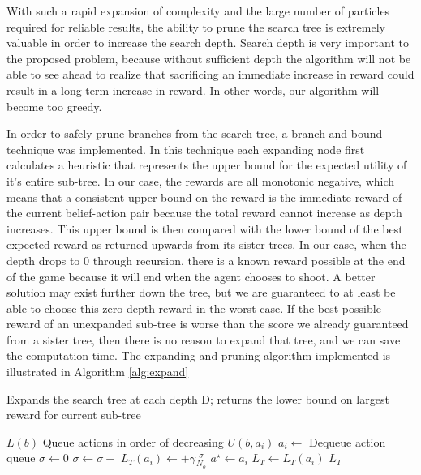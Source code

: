 	With such a rapid expansion of complexity and the large number of particles required for reliable results, the ability to prune the search tree is extremely valuable in order to increase the search depth.  Search depth is very important to the proposed problem, because without sufficient depth the algorithm will not be able to see ahead to realize that sacrificing an immediate increase in reward could result in a long-term increase in reward.  In other words, our algorithm will become too greedy.
	
	In order to safely prune branches from the search tree, a branch-and-bound technique was implemented.  In this technique each expanding node first calculates a heuristic that represents the upper bound for the expected utility of it's entire sub-tree.  In our case, the rewards are all monotonic negative, which means that a consistent upper bound on the reward is the immediate reward of the current belief-action pair because the total reward cannot increase as depth increases.  This upper bound is then compared with the lower bound of the best expected reward as returned upwards from its sister trees.  In our case, when the depth drops to 0 through recursion, there is a known reward possible at the end of the game because it will end when the agent chooses to shoot.  A better solution may exist further down the tree, but we are guaranteed to at least be able to choose this zero-depth reward in the worst case.  If the best possible reward of an unexpanded sub-tree is worse than the score we already guaranteed from a sister tree, then there is no reason to expand that tree, and we can save the computation time. The expanding and pruning algorithm implemented is illustrated in Algorithm \ref{alg:expand}
	
	\begin{algorithm}\caption{Expands the search tree at each depth D; returns the lower bound on largest reward for current sub-tree}\label{alg:expand}
	\begin{algorithmic}
				\State \Return $L\left(b\right)$
			\Else
				\State Queue actions in order of decreasing $U\left(b, a_i\right)$
					\State $a_i \gets$ Dequeue action queue
					\State $\sigma \gets 0$
						\State $\sigma \gets \sigma +$ 
					\EndFor
					\State $L_T\left(a_i\right) \gets $$+ \gamma\frac{\sigma}{N_o}$
						\State $a^{\star} \gets a_i$
						\State $L_T \gets L_T\left(a_i\right)$
					\EndIf
				\EndWhile
			\EndIf
			\State \Return $L_T$
		\EndFunction
	\end{algorithmic}
	\end{algorithm}
	
